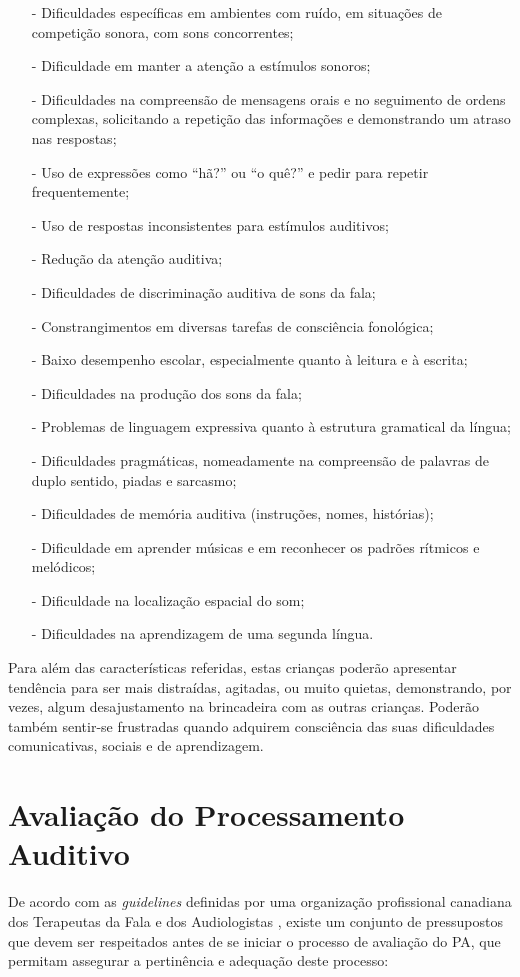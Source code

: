 \documentclass[output=paper,colorlinks,citecolor=brown,booklanguage=portuguese]{langscibook}
\begin{document}
\begin{itemize}
    \item [-] Dificuldades específicas em ambientes com ruído, em situações de competição sonora, com sons concorrentes;
\item[-] Dificuldade em manter a atenção a estímulos sonoros;
\item[-] Dificuldades na compreensão de mensagens orais e no seguimento de ordens complexas, solicitando a repetição das informações e demonstrando um atraso nas respostas;
\item[-] Uso de expressões como “hã?” ou “o quê?” e pedir para repetir frequentemente;
\item[-] Uso de respostas inconsistentes para estímulos auditivos;
\item[-] Redução da atenção auditiva;
\item[-] Dificuldades de discriminação auditiva de sons da fala;
\item[-] Constrangimentos em diversas tarefas de consciência fonológica;
\item[-] Baixo desempenho escolar, especialmente quanto à leitura e à escrita;
\item[-] Dificuldades na produção dos sons da fala;
\item[-] Problemas de linguagem expressiva quanto à estrutura gramatical da língua;
\item[-] Dificuldades pragmáticas, nomeadamente na compreensão de palavras de duplo sentido, piadas e sarcasmo;
\item[-] Dificuldades de memória auditiva (instruções, nomes, histórias);
\item[-] Dificuldade em aprender músicas e em reconhecer os padrões rítmicos e melódicos;
\item[-] Dificuldade na localização espacial do som;
\item[-] Dificuldades na aprendizagem de uma segunda língua.
\end{itemize}
Para além das características referidas, estas crianças poderão apresentar tendência para ser mais distraídas, agitadas, ou muito quietas, demonstrando, por vezes, algum desajustamento na brincadeira com as outras crianças.  Poderão também sentir-se frustradas quando adquirem consciência das suas dificuldades comunicativas, sociais e de aprendizagem.

\section{Avaliação do Processamento Auditivo}
De acordo com as \emph{guidelines} definidas por uma organização profissional canadiana dos Terapeutas da Fala e dos Audiologistas \citep{CISG2012}, existe um conjunto de pressupostos que devem ser respeitados antes de se iniciar o processo de avaliação do PA, que permitam assegurar a pertinência e adequação deste processo:
\end{document}

